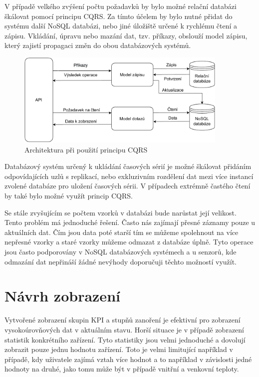 V případě velkého zvýšení počtu požadavků by bylo možné relační databázi škálovat pomocí principu CQRS. Za tímto účelem by bylo nutné přidat do systému další NoSQL databázi, nebo jiné úložiště určené k rychlému čtení a zápisu. Vkládání, úpravu nebo mazání dat, tzv. příkazy, obslouží model zápisu, který zajistí propagaci změn do obou databázových systémů.

\begin{figure}[H]
\label{question4}
\begin{center}
    \includegraphics[width=0.9\textwidth]{obrazky-figures/csqr.pdf}
\end{center}
\caption{Architektura při použití principu CQRS}
\end{figure}

Databázový systém určený k ukládání časových sérií je možné škálovat přidáním odpovídajících uzlů s replikací, nebo exkluzivním rozdělení dat mezi více instancí zvolené databáze pro uložení časových sérii. V případech extrémně častého čtení by také bylo možné využít princip CQRS.

Se stále zvyšujícím se počtem vzorků v databázi bude narůstat její velikost. Tento problém má jednoduché řešení. Často nás zajímají přesné záznamy pouze u aktuálních dat. Čím jsou data poté starší tím se můžeme spolehnout na více nepřesné vzorky a staré vzorky můžeme odmazat z databáze úplně. Tyto operace jsou často podporovány v NoSQL databázových systémech a u senzorů, kde odmazání dat nepřináší žádné nevýhody doporučuji těchto možností využít.

\section{Návrh zobrazení}

Vytvořené zobrazení skupin KPI a stupňů zanoření je efektivní pro zobrazení vysokoúrovňových dat v aktuálním stavu. Horší situace je v případě zobrazení statistik konkrétního zařízení. Tyto statistiky jsou velmi jednoduché a dovolují zobrazit pouze jednu hodnotu zařízení. Toto je velmi limitující například v případě, kdy uživatele zajímá vztah více hodnot a to například v závislosti jedné hodnoty na druhé, jako tomu může být v případě vnitřní a venkovní teploty.

